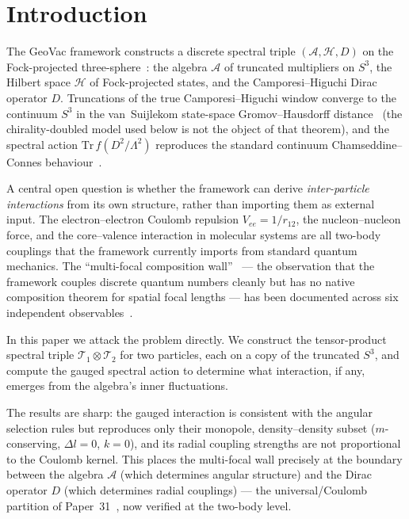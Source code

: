 \documentclass[twocolumn,pra,amsmath,amssymb,superscriptaddress]{revtex4-2}
\begin{document}
\section{Introduction}
\label{sec:intro}

The GeoVac framework constructs a discrete spectral triple
$(\mathcal{A}, \mathcal{H}, D)$ on the Fock-projected
three-sphere~\cite{paper7,paper32}: the algebra $\mathcal{A}$ of
truncated multipliers on $S^3$, the Hilbert space $\mathcal{H}$ of
Fock-projected states, and the Camporesi--Higuchi Dirac operator $D$.
Truncations of the true Camporesi--Higuchi window converge to the
continuum $S^3$ in the van~Suijlekom state-space
Gromov--Hausdorff distance~\cite{paper38} (the chirality-doubled model
used below is not the object of that theorem), and the spectral action
$\mathrm{Tr}\,f(D^2/\Lambda^2)$ reproduces the standard continuum
Chamseddine--Connes behaviour~\cite{paper51}.

A central open question is whether the framework can derive
\emph{inter-particle interactions} from its own structure, rather than
importing them as external input. The electron--electron Coulomb
repulsion $V_{ee} = 1/r_{12}$, the nucleon--nucleon force, and the
core--valence interaction in molecular systems are all two-body
couplings that the framework currently imports from standard quantum
mechanics. The ``multi-focal composition wall''~\cite{paper34} ---
the observation that the framework couples discrete quantum numbers
cleanly but has no native composition theorem for spatial focal
lengths --- has been documented across six independent
observables~\cite{CLAUDE_wall}.

In this paper we attack the problem directly. We construct the
tensor-product spectral triple $\mathcal{T}_1 \otimes \mathcal{T}_2$
for two particles, each on a copy of the truncated $S^3$, and compute
the gauged spectral action to determine what interaction, if any,
emerges from the algebra's inner fluctuations.

The results are sharp: the gauged interaction is consistent with the
angular selection rules but reproduces only their monopole,
density--density subset ($m$-conserving, $\Delta l = 0$, $k = 0$), and
its radial coupling strengths are not proportional to the Coulomb
kernel. This places the multi-focal wall precisely at the
boundary between the algebra $\mathcal{A}$ (which determines angular
structure) and the Dirac operator $D$ (which determines radial
couplings) --- the universal/Coulomb partition of
Paper~31~\cite{paper31}, now verified at the two-body level.
\end{document}

